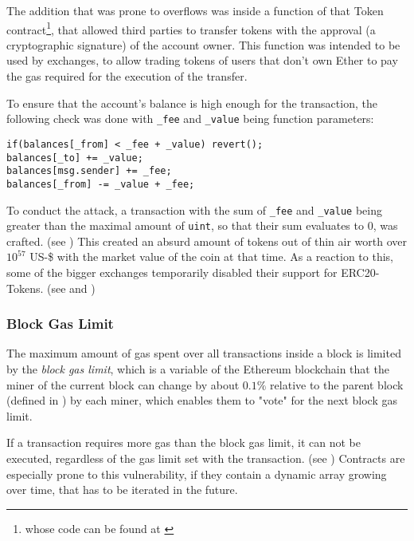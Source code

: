 The addition that was prone to overflows was inside a function of that Token contract\footnote{whose code can be found at \cite{etherscan:mesh:code}}, that allowed third parties to transfer tokens with the approval (a cryptographic signature) of the account owner. This function was intended to be used by exchanges, to allow trading tokens of users that don't own Ether to pay the gas required for the execution of the transfer.

To ensure that the account's balance is high enough for the transaction, the following check was done with \texttt{_fee} and \texttt{_value} being function parameters:
\begin{verbatim}
if(balances[_from] < _fee + _value) revert();
balances[_to] += _value;
balances[msg.sender] += _fee;
balances[_from] -= _value + _fee;
\end{verbatim}

To conduct the attack, a transaction with the sum of \texttt{_fee} and \texttt{_value} being greater than the maximal amount of \texttt{uint}, so that their sum evaluates to \( 0 \), was crafted. (see \cite{etherscan:mesh:transaction}) This created an absurd amount of tokens out of thin air worth over \( 10^{57} \) US-\$ with the market value of the coin at that time. As a reaction to this, some of the bigger exchanges temporarily disabled their support for ERC20-Tokens. (see \cite{cryptoslate:batchoverflow} and \cite{medium:integeroverflowerc20})

\subsubsection{Block Gas Limit}
The maximum amount of gas spent over all transactions inside a block is limited by the \textit{block gas limit}, which is a variable of the Ethereum blockchain that the miner of the current block can change by about \( 0.1 \% \) relative to the parent block (defined in \cite[Section 4.3.4, equation 47]{ethereum:yellowpaper}) by each miner, which enables them to "vote" for the next block gas limit.

If a transaction requires more gas than the block gas limit, it can not be executed, regardless of the gas limit set with the transaction. (see \cite[Security Considerations, Block Gas Limit and Loops]{ethereum:solidity}) Contracts are especially prone to this vulnerability, if they contain a dynamic array growing over time, that has to be iterated in the future.


